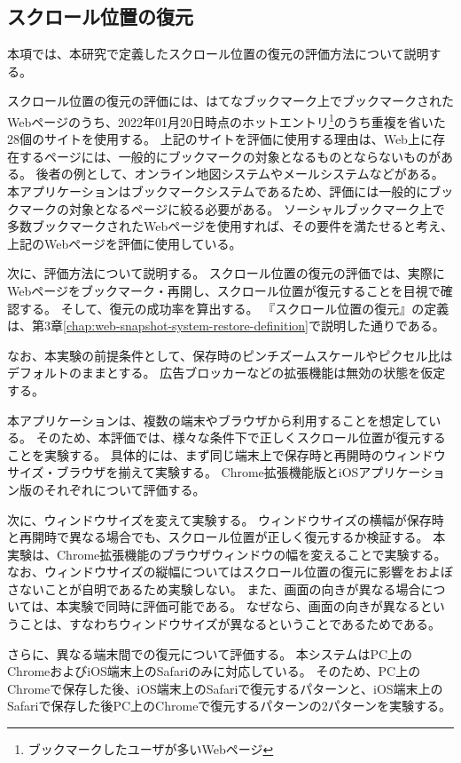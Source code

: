\subsection{スクロール位置の復元}
本項では、本研究で定義したスクロール位置の復元の評価方法について説明する。

スクロール位置の復元の評価には、はてなブックマーク上でブックマークされたWebページのうち、2022年01月20日時点のホットエントリ\footnote{ブックマークしたユーザが多いWebページ}のうち重複を省いた28個のサイトを使用する。
上記のサイトを評価に使用する理由は、Web上に存在するページには、一般的にブックマークの対象となるものとならないものがある。
後者の例として、オンライン地図システムやメールシステムなどがある。
本アプリケーションはブックマークシステムであるため、評価には一般的にブックマークの対象となるページに絞る必要がある。
ソーシャルブックマーク上で多数ブックマークされたWebページを使用すれば、その要件を満たせると考え、上記のWebページを評価に使用している。


次に、評価方法について説明する。
スクロール位置の復元の評価では、実際にWebページをブックマーク・再開し、スクロール位置が復元することを目視で確認する。
そして、復元の成功率を算出する。
『スクロール位置の復元』の定義は、第3章\ref{chap:web-snapshot-system-restore-definition}で説明した通りである。

なお、本実験の前提条件として、保存時のピンチズームスケールやピクセル比はデフォルトのままとする。
広告ブロッカーなどの拡張機能は無効の状態を仮定する。

本アプリケーションは、複数の端末やブラウザから利用することを想定している。
そのため、本評価では、様々な条件下で正しくスクロール位置が復元することを実験する。
具体的には、まず同じ端末上で保存時と再開時のウィンドウサイズ・ブラウザを揃えて実験する。
Chrome拡張機能版とiOSアプリケーション版のそれぞれについて評価する。

次に、ウィンドウサイズを変えて実験する。
ウィンドウサイズの横幅が保存時と再開時で異なる場合でも、スクロール位置が正しく復元するか検証する。
本実験は、Chrome拡張機能のブラウザウィンドウの幅を変えることで実験する。
なお、ウィンドウサイズの縦幅についてはスクロール位置の復元に影響をおよぼさないことが自明であるため実験しない。
また、画面の向きが異なる場合については、本実験で同時に評価可能である。
なぜなら、画面の向きが異なるということは、すなわちウィンドウサイズが異なるということであるためである。

さらに、異なる端末間での復元について評価する。
本システムはPC上のChromeおよびiOS端末上のSafariのみに対応している。
そのため、PC上のChromeで保存した後、iOS端末上のSafariで復元するパターンと、iOS端末上のSafariで保存した後PC上のChromeで復元するパターンの2パターンを実験する。


